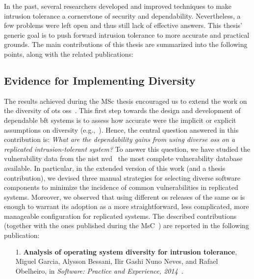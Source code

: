 In the past, several researchers developed and improved techniques to make intrusion tolerance a cornerstone of security and dependability.
Nevertheless, a few problems were left open and thus still lack of effective answers.
This thesis' generic goal is to push forward intrusion tolerance to more accurate and practical grounds.
The main contributions of this thesis are summarized into the following points, along with the related publications:


\subsection{Evidence for Implementing Diversity}%


The results achieved during the MSc thesis encouraged us to extend the work on the diversity of \gls{ots} \glspl{os}~\cite{Garcia:2012}.
This first step towards the design and development of dependable \gls{bft} systems is to assess how accurate were the implicit or explicit assumptions on diversity (e.g.,~\cite{Abd-El-Malek:2005,Bessani:2008,Castro:2002,Castro:2003,Clement:2009,Correia:2004,Kapitza:2012,Kotla:2010,Moniz:2011,Yin:2003}).
Hence, the central question answered in this contribution is: \emph{What are the dependability gains from using diverse \glspl{os} on a replicated  intrusion-tolerant system?} 
To answer this question, we have studied the vulnerability data from the \gls{nist} \gls{nvd}~\cite{nvd} the most complete vulnerability database available.
In particular, in the extended version of this work (and a thesis contribution), we devised three manual strategies for selecting diverse software components to minimize the incidence of common vulnerabilities in replicated systems.
Moreover, we observed that using different \gls{os} releases of the same \gls{os} is enough to warrant its adoption as a more straightforward, less complicated, more manageable configuration for replicated systems.
The described contributions (together with the ones published during the MsC~\cite{Garcia:2012}) are reported in the following publication:

\begin{enumerate}
\item[1.] \textbf{Analysis of operating system diversity for intrusion tolerance}, Miguel Garcia, Alysson Bessani, Ilir Gashi Nuno Neves, and Rafael Obelheiro, in \emph{Software: Practice and Experience, 2014}~\cite{Garcia:2014}.
\end{enumerate}



